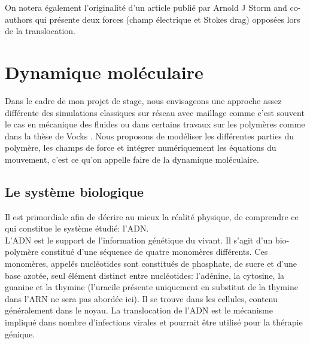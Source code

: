 \documentclass[a4paper,11pt]{article}
\begin{document}
On notera également l'originalité d'un article publié par Arnold J Storm and co-authors \cite{storm} qui présente deux forces (champ électrique et Stokes drag) opposées lors de la translocation.



\newpage 

\section{Dynamique moléculaire}

Dans le cadre de mon projet de stage, nous envisageons une approche assez différente des simulations classiques sur réseau avec maillage comme c'est souvent le cas en mécanique des fluides ou dans certains travaux sur les polymères comme dans la thèse de Vocks \cite{these}. Nous proposons de modéliser les différentes parties du polymère, les champs de force et intégrer numériquement les équations du mouvement, c'est ce qu'on appelle faire de la dynamique moléculaire.

\subsection{Le système biologique}

Il est primordiale afin de décrire au mieux la réalité physique, de comprendre ce qui constitue le système étudié: l'ADN.\\

L'ADN est le support de l'information génétique du vivant. Il s'agit d'un bio-polymère constitué d'une séquence de quatre monomères différents. Ces monomères, appelés nucléotides sont constitués de phosphate, de sucre et d'une base azotée, seul élément distinct entre nucléotides: l'adénine, la cytosine, la guanine et la thymine (l'uracile présente uniquement en substitut de la thymine dans l'ARN ne sera pas abordée ici). Il se trouve dans les cellules, contenu généralement dans le noyau. La translocation de l'ADN est le mécanisme impliqué dans nombre d'infections virales et pourrait être utilisé pour la thérapie génique.
\end{document}
